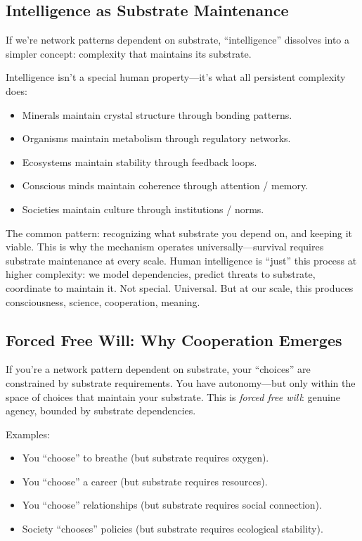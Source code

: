 \documentclass[12pt,a4paper]{article}
\begin{document}
\subsection{Intelligence as Substrate Maintenance}

If we're network patterns dependent on substrate, ``intelligence'' dissolves into a simpler concept: complexity that maintains its substrate.

Intelligence isn't a special human property---it's what all persistent complexity does:
\begin{itemize}
    \item Minerals maintain crystal structure through bonding patterns.
    \item Organisms maintain metabolism through regulatory networks.
    \item Ecosystems maintain stability through feedback loops.
    \item Conscious minds maintain coherence through attention / memory.
    \item Societies maintain culture through institutions / norms.
\end{itemize}

The common pattern: recognizing what substrate you depend on, and keeping it viable. This is why the mechanism operates universally---survival requires substrate maintenance at every scale. Human intelligence is ``just'' this process at higher complexity: we model dependencies, predict threats to substrate, coordinate to maintain it. Not special. Universal. But at our scale, this produces consciousness, science, cooperation, meaning.

\subsection{Forced Free Will: Why Cooperation Emerges}

If you're a network pattern dependent on substrate, your ``choices'' are constrained by substrate requirements. You have autonomy---but only within the space of choices that maintain your substrate. This is \emph{forced free will}: genuine agency, bounded by substrate dependencies.

Examples:
\begin{itemize}
    \item You ``choose'' to breathe (but substrate requires oxygen).
    \item You ``choose'' a career (but substrate requires resources).
    \item You ``choose'' relationships (but substrate requires social connection).
    \item Society ``chooses'' policies (but substrate requires ecological stability).
\end{itemize}
\end{document}
